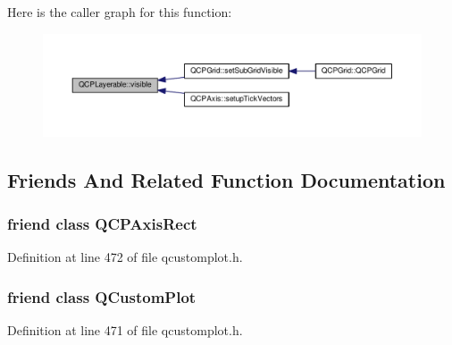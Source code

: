 Here is the caller graph for this function\+:\nopagebreak
\begin{figure}[H]
\begin{center}
\leavevmode
\includegraphics[width=350pt]{class_q_c_p_layerable_a10a3cc92e0fa63e4a929e61d34e275a7_icgraph}
\end{center}
\end{figure}




\subsection{Friends And Related Function Documentation}
\hypertarget{class_q_c_p_layerable_acbf20ecb140f66c5fd1bc64ae0762990}{}
\subsubsection[{Q\+C\+P\+Axis\+Rect}]{\setlength{\rightskip}{0pt plus 5cm}friend class {\bf Q\+C\+P\+Axis\+Rect}\hspace{0.3cm}{\ttfamily [friend]}}\label{class_q_c_p_layerable_acbf20ecb140f66c5fd1bc64ae0762990}


Definition at line 472 of file qcustomplot.\+h.

\hypertarget{class_q_c_p_layerable_a1cdf9df76adcfae45261690aa0ca2198}{}
\subsubsection[{Q\+Custom\+Plot}]{\setlength{\rightskip}{0pt plus 5cm}friend class {\bf Q\+Custom\+Plot}\hspace{0.3cm}{\ttfamily [friend]}}\label{class_q_c_p_layerable_a1cdf9df76adcfae45261690aa0ca2198}


Definition at line 471 of file qcustomplot.\+h.



